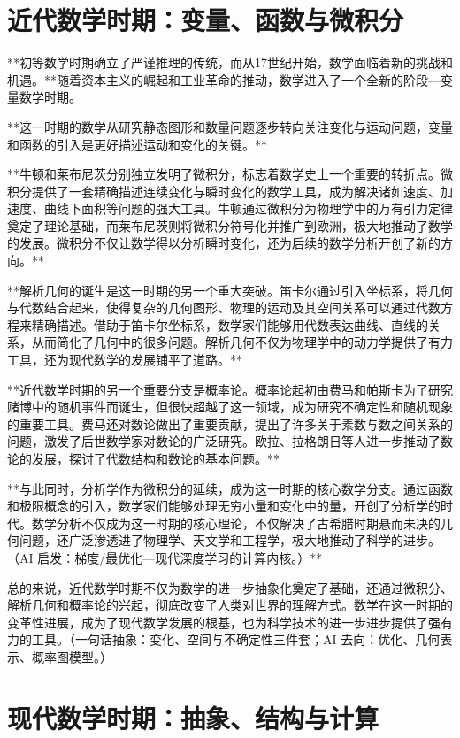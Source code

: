 \section{近代数学时期：变量、函数与微积分}

**初等数学时期确立了严谨推理的传统，而从17世纪开始，数学面临着新的挑战和机遇。**随着资本主义的崛起和工业革命的推动，数学进入了一个全新的阶段---变量数学时期。

**这一时期的数学从研究静态图形和数量问题逐步转向关注变化与运动问题，变量和函数的引入是更好描述运动和变化的关键。**

**牛顿和莱布尼茨分别独立发明了微积分，标志着数学史上一个重要的转折点。微积分提供了一套精确描述连续变化与瞬时变化的数学工具，成为解决诸如速度、加速度、曲线下面积等问题的强大工具。牛顿通过微积分为物理学中的万有引力定律奠定了理论基础，而莱布尼茨则将微积分符号化并推广到欧洲，极大地推动了数学的发展。微积分不仅让数学得以分析瞬时变化，还为后续的数学分析开创了新的方向。**

**解析几何的诞生是这一时期的另一个重大突破。笛卡尔通过引入坐标系，将几何与代数结合起来，使得复杂的几何图形、物理的运动及其空间关系可以通过代数方程来精确描述。借助于笛卡尔坐标系，数学家们能够用代数表达曲线、直线的关系，从而简化了几何中的很多问题。解析几何不仅为物理学中的动力学提供了有力工具，还为现代数学的发展铺平了道路。**

**近代数学时期的另一个重要分支是概率论。概率论起初由费马和帕斯卡为了研究赌博中的随机事件而诞生，但很快超越了这一领域，成为研究不确定性和随机现象的重要工具。费马还对数论做出了重要贡献，提出了许多关于素数与数之间关系的问题，激发了后世数学家对数论的广泛研究。欧拉、拉格朗日等人进一步推动了数论的发展，探讨了代数结构和数论的基本问题。**

**与此同时，分析学作为微积分的延续，成为这一时期的核心数学分支。通过函数和极限概念的引入，数学家们能够处理无穷小量和变化中的量，开创了分析学的时代。数学分析不仅成为这一时期的核心理论，不仅解决了古希腊时期悬而未决的几何问题，还广泛渗透进了物理学、天文学和工程学，极大地推动了科学的进步。{（AI 启发：梯度/最优化—现代深度学习的计算内核。）}**

总的来说，近代数学时期不仅为数学的进一步抽象化奠定了基础，还通过微积分、解析几何和概率论的兴起，彻底改变了人类对世界的理解方式。数学在这一时期的变革性进展，成为了现代数学发展的根基，也为科学技术的进一步进步提供了强有力的工具。{（一句话抽象：变化、空间与不确定性三件套；AI 去向：优化、几何表示、概率图模型。）}

\section{现代数学时期：抽象、结构与计算}

